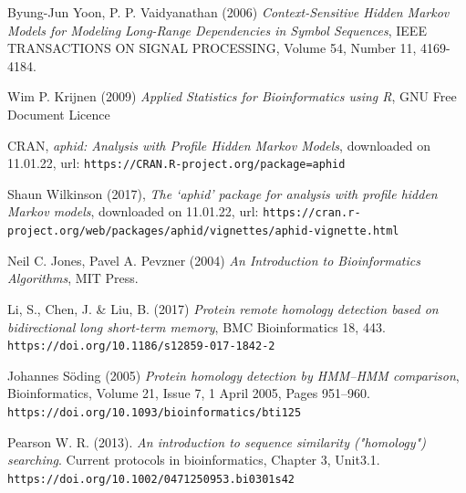 \documentclass{article}\usepackage[]{graphicx}\usepackage[]{color}
\begin{document}
\begin{thebibliography}{20}
Byung-Jun Yoon, P. P. Vaidyanathan (2006) \emph{Context-Sensitive Hidden Markov Models for Modeling Long-Range Dependencies in Symbol Sequences}, IEEE TRANSACTIONS ON SIGNAL PROCESSING, Volume 54, Number 11, 4169-4184.

Wim P. Krijnen (2009) \emph{Applied Statistics for Bioinformatics using R}, GNU Free Document Licence

CRAN, \emph{aphid: Analysis with Profile Hidden Markov Models}, downloaded on 11.01.22, 
url: \verb$https://CRAN.R-project.org/package=aphid$

Shaun Wilkinson (2017), \emph{The ‘aphid’ package for analysis with profile hidden Markov models}, downloaded on 11.01.22, 
url: \verb$https://cran.r-project.org/web/packages/aphid/vignettes/aphid-vignette.html$

Neil C. Jones, Pavel A. Pevzner (2004) \emph{An Introduction to Bioinformatics Algorithms}, MIT Press. 

Li, S., Chen, J. \& Liu, B. (2017) \emph{Protein remote homology detection based on bidirectional long short-term memory}, BMC Bioinformatics 18, 443. \verb$https://doi.org/10.1186/s12859-017-1842-2$

Johannes Söding (2005) \emph{Protein homology detection by HMM–HMM comparison}, Bioinformatics, Volume 21, Issue 7, 1 April 2005, Pages 951–960. \verb$https://doi.org/10.1093/bioinformatics/bti125$

Pearson W. R. (2013). \emph{An introduction to sequence similarity ("homology") searching}. Current protocols in bioinformatics, Chapter 3, Unit3.1. \verb$https://doi.org/10.1002/0471250953.bi0301s42$

\end{thebibliography}
\end{document}
